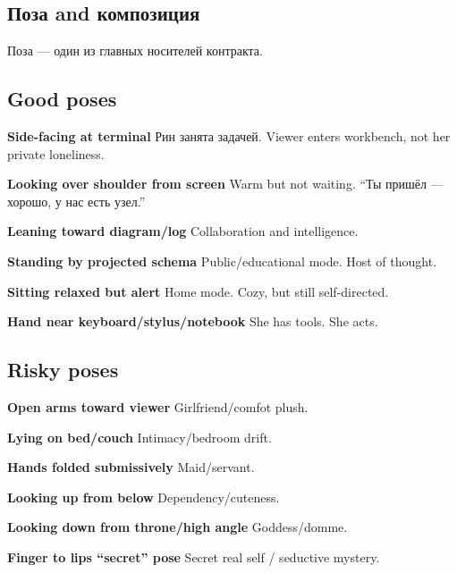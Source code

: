 \subsection*{Поза and композиция}

Поза --- один из главных носителей контракта.

\subsection*{Good poses}

\textbf{Side-facing at terminal} Рин занята задачей. Viewer enters
workbench, not her private loneliness.

\textbf{Looking over shoulder from screen} Warm but not waiting. ``Ты
пришёл --- хорошо, у нас есть узел.''

\textbf{Leaning toward diagram/\hspace{0pt}log} Collaboration and intelligence.

\textbf{Standing by projected schema} Public/\hspace{0pt}educational mode. Host of
thought.

\textbf{Sitting relaxed but alert} Home mode. Cozy, but still
self-directed.

\textbf{Hand near keyboard/\hspace{0pt}stylus/\hspace{0pt}notebook} She has tools. She acts.

\subsection*{Risky poses}

\textbf{Open arms toward viewer} Girlfriend/\hspace{0pt}comfot plush.

\textbf{Lying on bed/\hspace{0pt}couch} Intimacy/\hspace{0pt}bedroom drift.

\textbf{Hands folded submissively} Maid/\hspace{0pt}servant.

\textbf{Looking up from below} Dependency/\hspace{0pt}cuteness.

\textbf{Looking down from throne/\hspace{0pt}high angle} Goddess/\hspace{0pt}domme.

\textbf{Finger to lips ``secret'' pose} Secret real self /\hspace{0pt} seductive
mystery.

